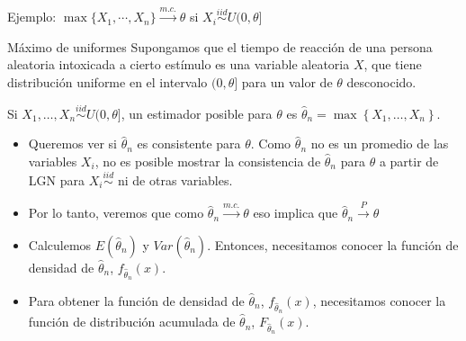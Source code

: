 \documentclass{beamer}
\theoremstyle{definition}
\newcommand{\cmc}{\overset{m.c.}{\rightarrow}}
\newcommand{\cp}{\overset{P}{\rightarrow}}
\begin{document}
\begin{frame}{\color{rosee}Ejemplo: $\max\{X_1,\cdots , X_n\} \cmc \theta$ si $X_i\stackrel{iid}{\sim} U(0,\theta]$}\small
  \begin{exampleblock}{M\'aximo de uniformes}
    Supongamos que el tiempo de reacci\'on de una persona aleatoria intoxicada a
    cierto est\'imulo es una variable aleatoria $X$, que tiene
    distribuci\'on uniforme en el intervalo $(0, \theta]$ para un valor
    de $\theta$ desconocido. 

    \medskip Si  $X_{1},\dots,X_n\stackrel{iid}{\sim} U(0,\theta]$, un estimador posible para $\theta$ es $\widehat{\theta}_n=\max\left\lbrace X_{1},\dots,X_n \right\rbrace$.
   \medskip 
    \begin{itemize}
        \item Queremos ver si $\widehat{\theta}_n$ es consistente para
    $\theta$. Como $\widehat{\theta}_n$ no es un promedio de las variables $X_i$, no es posible mostrar la consistencia de $\widehat{\theta}_n$ para $\theta$ a partir de LGN para $X_i\stackrel{iid}{\sim}$ ni de otras variables.
    
    \item Por lo tanto, veremos que como $\widehat{\theta}_n \cmc \theta$ eso implica que $\widehat{\theta}_n \cp \theta$
    \item Calculemos $E(\widehat{\theta}_n)$ y
    $Var(\widehat{\theta}_n)$. Entonces, necesitamos conocer la función de densidad de $\widehat{\theta}_n$, $f_{\widehat{\theta}_n}(x)$.
     \item Para obtener la función de densidad de $\widehat{\theta}_n$, $f_{\widehat{\theta}_n}(x)$, necesitamos conocer la función de distribución acumulada de $\widehat{\theta}_n$, $F_{\widehat{\theta}_n}(x)$.
    \end{itemize}
  \end{exampleblock}
\end{frame}
\end{document}
